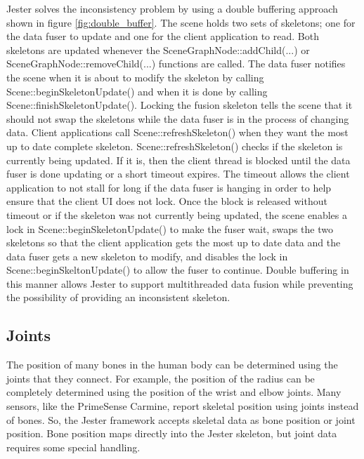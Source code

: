 Jester solves the inconsistency problem by using a double buffering approach shown in figure \ref{fig:double_buffer}. The scene holds two sets of skeletons; one for the data fuser to update and one for the client application to read. Both skeletons are updated whenever the SceneGraphNode::addChild(...) or SceneGraphNode::removeChild(...) functions are called. The data fuser notifies the scene when it is about to modify the skeleton by calling Scene::beginSkeletonUpdate() and when it is done by calling Scene::finishSkeletonUpdate(). Locking the fusion skeleton tells the scene that it should not swap the skeletons while the data fuser is in the process of changing data. Client applications call Scene::refreshSkeleton() when they want the most up to date complete skeleton. Scene::refreshSkeleton() checks if the skeleton is currently being updated. If it is, then the client thread is blocked until the data fuser is done updating or a short timeout expires. The timeout allows the client application to not stall for long if the data fuser is hanging in order to help ensure that the client UI does not lock. Once the block is released without timeout or if the skeleton was not currently being updated, the scene enables a lock in Scene::beginSkeletonUpdate() to make the fuser wait, swaps the two skeletons so that the client application gets the most up to date data and the data fuser gets a new skeleton to modify, and disables the lock in Scene::beginSkeltonUpdate() to allow the fuser to continue. Double buffering in this manner allows Jester to support multithreaded data fusion while preventing the possibility of providing an inconsistent skeleton.

\subsection{Joints}

The position of many bones in the human body can be determined using the joints that they connect. For example, the position of the radius can be completely determined using the position of the wrist and elbow joints. Many sensors, like the PrimeSense Carmine, report skeletal position using joints instead of bones. So, the Jester framework accepts skeletal data as bone position or joint position. Bone position maps directly into the Jester skeleton, but joint data requires some special handling.


